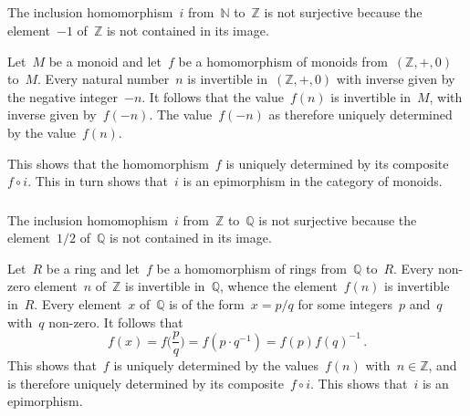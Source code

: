 \subsection{}



\subsubsection{}

The inclusion homomorphism~$i$ from~$ℕ$ to~$ℤ$ is not surjective because the element~$-1$ of~$ℤ$ is not contained in its image.

Let~$M$ be a monoid and let~$f$ be a homomorphism of monoids from~$(ℤ, +, 0)$ to~$M$.
Every natural number~$n$ is invertible in~$(ℤ, +, 0)$ with inverse given by the negative integer~$-n$.
It follows that the value~$f(n)$ is invertible in~$M$, with inverse given by~$f(-n)$.
The value~$f(-n)$ as therefore uniquely determined by the value~$f(n)$.

This shows that the homomorphism~$f$ is uniquely determined by its composite~$f ∘ i$.
This in turn shows that~$i$ is an epimorphism in the category of monoids.



\subsubsection{}

The inclusion homomophism~$i$ from~$ℤ$ to~$ℚ$ is not surjective because the element~$1 / 2$ of~$ℚ$ is not contained in its image.

Let~$R$ be a ring and let~$f$ be a homomorphism of rings from~$ℚ$ to~$R$.
Every non-zero element~$n$ of~$ℤ$ is invertible in~$ℚ$, whence the element~$f(n)$ is invertible in~$R$.
Every element~$x$ of~$ℚ$ is of the form~$x = p / q$ for some integers~$p$ and~$q$ with~$q$ non-zero.
It follows that
\[
	f(x)
	=
	f\biggl( \frac{p}{q} \biggr)
	=
	f( p ⋅ q^{-1} )
	=
	f(p) f(q)^{-1} \,.
\]
This shows that~$f$ is uniquely determined by the values~$f(n)$ with~$n ∈ ℤ$, and is therefore uniquely determined by its composite~$f ∘ i$.
This shows that~$i$ is an epimorphism.
